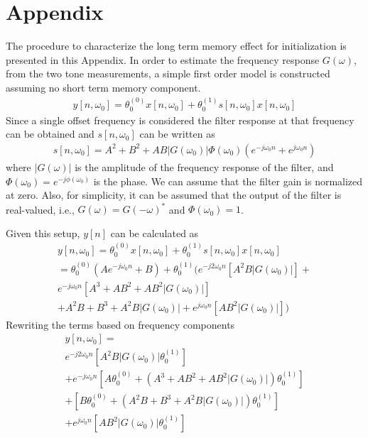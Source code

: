 \documentclass[journal]{IEEEtran}
\begin{document}
\section*{Appendix}\label{append}
The procedure to characterize the long term memory effect for initialization is presented in this Appendix. In order to estimate the frequency response $G(\omega)$, from the two tone measurements, a simple first order model is constructed assuming no short term memory component.
\begin{align}
y[n,\omega_0] = \theta_0^{(0)}x[n,\omega_0] + \theta_0^{(1)}s[n,\omega_0]x[n,\omega_0] \label{math1append}
\end{align}
Since a single offset frequency is considered the filter response at that frequency can be obtained and $s[n,\omega_0]$ can be written as
\begin{align}
s[n,\omega_0] = A^2 + B^2 + AB|G(\omega_0)|\Phi(\omega_0)\left(e^{-j\omega_0n}+e^{j\omega_0n}\right)
\end{align}
where $|G(\omega)|$ is the amplitude of the frequency response of the filter, and $\Phi(\omega_0) = e^{-j\phi(\omega_0)}$ is the phase. We can assume that the filter gain is normalized at zero.
Also, for simplicity, it can be assumed that the output of the filter is real-valued, i.e., $G(\omega) = G(-\omega)^*$ and $\Phi(\omega_0)=1$.

Given this setup, $y[n]$ can be calculated as
\begin{eqnarray}
\nonumber y[n,\omega_0] = \theta_0^{(0)}x[n,\omega_0] + \theta_0^{(1)}s[n,\omega_0]x[n,\omega_0]\\
\nonumber = \theta_0^{(0)}\left(Ae^{-j\omega_0n} + B\right) + \theta_0^{(1)}(e^{-j2\omega_0n}\left[A^2B|G(\omega_0)|\right] + \\
\nonumber e^{-j\omega_0n}\left[A^3+AB^2+AB^2|G(\omega_0)|\right]\\
\nonumber + A^2B + B^3 + A^2B|G(\omega_0)| + e^{j\omega_0n}\left[AB^2|G(\omega_0)|\right])
\end{eqnarray}
Rewriting the terms based on frequency components
\begin{eqnarray}
\nonumber y[n,\omega_0] = \\
\nonumber e^{-j2\omega_0n}\left[A^2B|G(\omega_0)|\theta_0^{(1)}\right] \\
\nonumber + e^{-j\omega_0n}\left[A\theta_0^{(0)}+ (A^3+AB^2+AB^2|G(\omega_0)|)\theta_0^{(1)}\right]\\
+ \left[B\theta_0^{(0)} + (A^2B + B^3 + A^2B|G(\omega_0)|)\theta_0^{(1)}\right] \\
\nonumber + e^{j\omega_0n}\left[AB^2|G(\omega_0)|\theta_0^{(1)}\right] \label{redmath1append}
\end{eqnarray}
\end{document}
